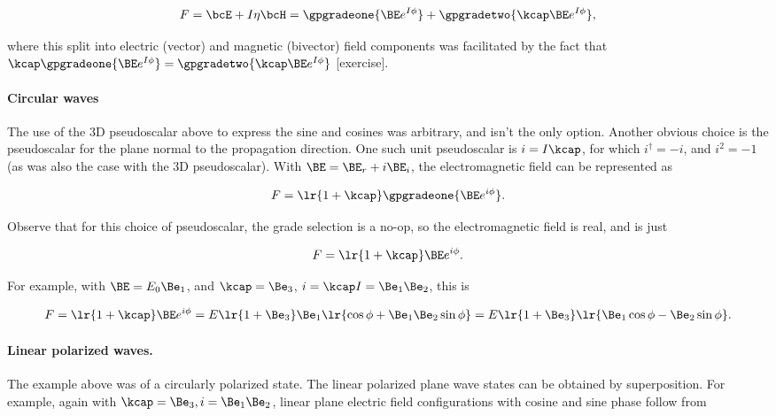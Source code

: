 \begin{equation}\label{eqn:ellipticalWaves:220}
F = \bcE + I \eta \bcH
=
\gpgradeone{ \BE e^{I \phi } } +
\gpgradetwo{ \kcap \BE e^{I \phi } },
\end{equation}

where this split into electric (vector) and magnetic (bivector) field components was facilitated by
the fact that
\( \kcap \gpgradeone{ \BE e^{I \phi } } = \gpgradetwo{ \kcap \BE e^{I \phi } } \) [exercise].

\paragraph{Circular waves}

The use of the 3D pseudoscalar above to express the sine and cosines was arbitrary, and isn't the only option.  Another obvious choice is the pseudoscalar for the plane normal to the propagation direction.  One such unit pseudoscalar is \( i = I \kcap \), for which \( i^\dagger = -i \), and \( i^2 = -1 \) (as was also the case with the 3D pseudoscalar).
With \( \BE = \BE_r + i \BE_i \), the electromagnetic field can be represented as

\begin{dmath}\label{eqn:ellipticalWaves:240}
F
=
\lr{ 1 + \kcap } \gpgradeone{ \BE e^{i \phi } }.
\end{dmath}

Observe that for this choice of pseudoscalar, the grade selection is a no-op, so the electromagnetic field is real, and is just

\begin{dmath}\label{eqn:ellipticalWaves:260}
F
=
\lr{ 1 + \kcap } \BE e^{i \phi }.
\end{dmath}

For example, with \( \BE = E_0 \Be_1 \), and \( \kcap = \Be_3 \), \( i = \kcap I = \Be_1 \Be_2 \), this is

\begin{dmath}\label{eqn:ellipticalWaves:280}
F
=
\lr{ 1 + \kcap } \BE e^{i \phi }
=
E \lr{ 1 + \Be_3 } \Be_1 \lr{ \cos\phi + \Be_1 \Be_2 \sin\phi }
=
E \lr{ 1 + \Be_3 } \lr{ \Be_1 \cos\phi - \Be_2 \sin\phi }.
\end{dmath}

\paragraph{Linear polarized waves.}

The example above was of a circularly polarized state.  The linear polarized plane wave states can be obtained by superposition.  For example, again with \( \kcap = \Be_3, i = \Be_1 \Be_2 \), linear plane electric field configurations with cosine and sine phase follow from

